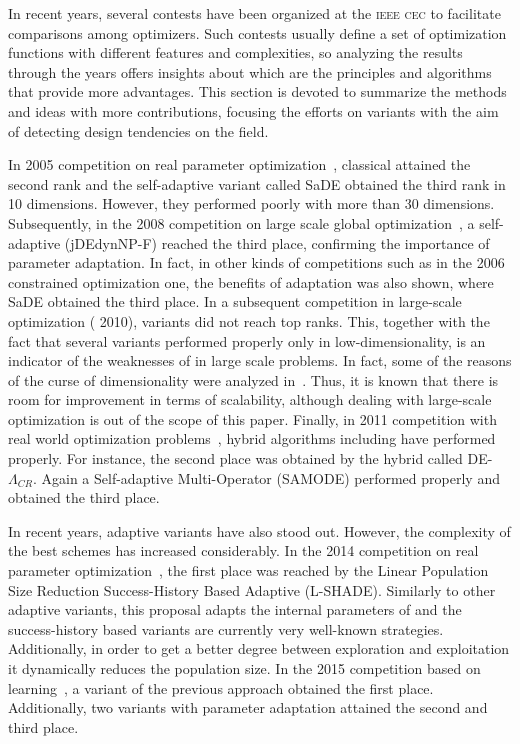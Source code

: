 In recent years, several contests have been organized at the \textsc{ieee cec} to facilitate comparisons among optimizers.
%
Such contests usually define a set of optimization functions with different features and complexities, so analyzing the results
through the years offers insights about which are the principles and algorithms that provide more advantages.
%
This section is devoted to summarize the methods and ideas with more contributions, focusing the efforts
on \DE{} variants with the aim of detecting design tendencies on the \DE{} field. 

In \CEC{} 2005 competition on real parameter optimization~\cite{CEC2005}, classical \DE{} attained the second rank and 
the self-adaptive \DE{} variant called SaDE obtained the third rank in 10 dimensions.
%
However, they performed poorly with more than 30 dimensions.
%
Subsequently, in the 2008 competition on large scale global optimization~\cite{CEC2008}, a self-adaptive \DE{} (jDEdynNP-F) 
reached the third place, confirming the importance of parameter adaptation.
%
In fact, in other kinds of competitions such as in the 2006 constrained optimization one, the benefits of adaptation 
was also shown, where SaDE obtained the third place.
%
In a subsequent competition in large-scale optimization (\CEC{} 2010), \DE{} variants did not reach top ranks.
%
This, together with the fact that several \DE{} variants performed properly only in low-dimensionality, 
is an indicator of the weaknesses of \DE{} in large scale problems.
%
In fact, some of the reasons of the curse of dimensionality were analyzed in~\cite{segura2015improving}.
%
Thus, it is known that there is room for improvement in terms of scalability, although dealing with large-scale optimization is out of 
the scope of this paper.
%
Finally, in \CEC{} 2011 competition with real world optimization problems~\cite{CEC2011}, hybrid algorithms including \DE{} have performed
properly.
%
For instance, the second place was obtained by the hybrid \DE{} called DE-$\Lambda_{CR}$.
%
Again a Self-adaptive Multi-Operator \DE{} (SAMODE) performed properly and obtained the third place.

In recent years, adaptive variants have also stood out.
%
However, the complexity of the best schemes has increased considerably.
%
In the 2014 competition on real parameter optimization~\cite{CEC2014}, the first place was reached by the Linear Population Size 
Reduction Success-History Based Adaptive \DE{} (L-SHADE).
%
Similarly to other adaptive variants, this proposal adapts the internal parameters of \DE{} and the success-history based variants
are currently very well-known strategies.
%
Additionally, in order to get a better degree between exploration and exploitation it dynamically reduces the population size.
%
In the 2015 competition based on learning~\cite{CEC2015}, a variant of the previous approach obtained the first place.
%
Additionally, two \DE{} variants with parameter adaptation attained the second and third place.

